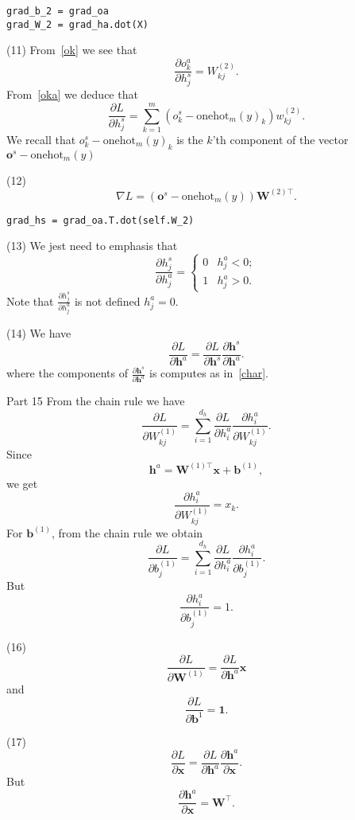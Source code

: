 \documentclass[11pt,english]{article}
\newcommand{\onehot}{\mathrm{onehot}}
\begin{document}
\begin{verbatim}
grad_b_2 = grad_oa
grad_W_2 = grad_ha.dot(X)
\end{verbatim}

(11) From~\eqref{ok} we see that
$$
\frac{\partial o_k^a}{\partial h_j^s}=W_{kj}^{(2)}.
$$
From~\eqref{oka} we deduce that
$$
\frac{\partial L}{\partial h_j^s}=\sum_{k=1}^m \left(o_k^s-\onehot_m(y)_k\right)w_{kj}^{(2)}.
$$
We recall that $o_k^s-\onehot_m(y)_k$ is the $k$'th component of the vector $\bm{o}^s-\onehot_m(y)$

(12)
$$
\nabla L=(\bm{o}^s-\onehot_m(y))\bm{W}^{(2)\top}.
$$

\begin{verbatim}
grad_hs = grad_oa.T.dot(self.W_2)
\end{verbatim}

(13) We jest need to emphasis that
\begin{equation}\label{char}
\frac{\partial h_j^s}{\partial h_j^a}=
\begin{cases}
0 & h_j^a<0;\\
1 & h_j^a>0.
\end{cases}
\end{equation}
Note that $\frac{\partial h_j^s}{\partial h_j^a}$ is not defined $h_j^a=0$.

(14) We have 
$$
\frac{\partial L}{\partial\bm{h}^a}=\frac{\partial L}{\partial\bm{h}^s}\frac{\partial \bm{h}^s}{\partial \bm{h}^a}.
$$
where the components of $\frac{\partial \bm{h}^s}{\partial\bm{h}^a}$ is computes as in~\eqref{char}.

\bigskip
{\noindent\color{red} Part 15}
From the chain rule we have 
$$
\frac{\partial L}{\partial W_{kj}^{(1)}}=\sum_{i=1}^{d_h}\frac{\partial L}{\partial h_i^a}\frac{\partial h_i^a}{\partial W_{kj}^{(1)}}.
$$
Since 
$$
\bm{h}^a=\bm{W}^{(1)\top}\bm{x}+\bm{b}^{(1)},
$$
we get 
$$
\frac{\partial h_i^a}{\partial W_{kj}^{(1)}}=x_k. 
$$
For $\bm{b}^{(1)}$, from the chain rule we obtain 
$$
\frac{\partial L}{\partial b_{j}^{(1)}}=\sum_{i=1}^{d_h}\frac{\partial L}{\partial h_i^a}\frac{\partial h_i^a}{\partial b_{j}^{(1)}}.
$$
But 
$$
\frac{\partial h_i^a}{\partial b_{j}^{(1)}}=1.
$$

(16)
$$
\frac{\partial L}{\partial \bm{W}^{(1)}}=\frac{\partial L}{\partial \bm{h}^a}\bm{x}
$$
and 
$$
\frac{\partial L}{\partial \bm{b}^{1}}=\bm{1}.
$$

(17)
$$
\frac{\partial L}{\partial\bm{x}}=\frac{\partial L}{\partial\bm{h}^a}\frac{\partial \bm{h}^a}{\partial\bm{x}}.
$$
But 
$$
\frac{\partial \bm{h}^a}{\partial\bm{x}}=\bm{W}^\top.
$$
\end{document}
